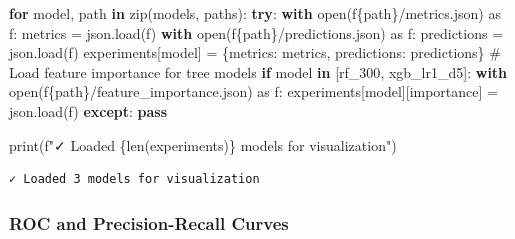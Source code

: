 \documentclass[
  letterpaper,
  DIV=11,
  numbers=noendperiod]{scrartcl}
\newenvironment{Shaded}{\begin{snugshade}}{\end{snugshade}}
\newcommand{\BuiltInTok}[1]{\textcolor[rgb]{0.00,0.23,0.31}{#1}}
\newcommand{\CommentTok}[1]{\textcolor[rgb]{0.37,0.37,0.37}{#1}}
\newcommand{\ControlFlowTok}[1]{\textcolor[rgb]{0.00,0.23,0.31}{\textbf{#1}}}
\newcommand{\ImportTok}[1]{\textcolor[rgb]{0.00,0.46,0.62}{#1}}
\newcommand{\KeywordTok}[1]{\textcolor[rgb]{0.00,0.23,0.31}{\textbf{#1}}}
\newcommand{\NormalTok}[1]{\textcolor[rgb]{0.00,0.23,0.31}{#1}}
\newcommand{\OperatorTok}[1]{\textcolor[rgb]{0.37,0.37,0.37}{#1}}
\newcommand{\SpecialCharTok}[1]{\textcolor[rgb]{0.37,0.37,0.37}{#1}}
\newcommand{\SpecialStringTok}[1]{\textcolor[rgb]{0.13,0.47,0.30}{#1}}
\newcommand{\StringTok}[1]{\textcolor[rgb]{0.13,0.47,0.30}{#1}}
\renewenvironment{Shaded}{%
  \begin{tcolorbox}[%
    enhanced,%
    colback=codebg,%
    colframe=codebg,%
    borderline west={3pt}{0pt}{sectionblue},%
    fontupper=\small\ttfamily,%
    boxrule=0pt,%
    arc=0pt,%
    boxsep=5pt,%
    left=2mm,%
    right=2mm,%
    top=2mm,%
    bottom=2mm%
  ]%
}{%
  \end{tcolorbox}%
}
\begin{document}
\begin{Shaded}
\begin{Highlighting}[]
\ControlFlowTok{for}\NormalTok{ model, path }\KeywordTok{in} \BuiltInTok{zip}\NormalTok{(models, paths):}
    \ControlFlowTok{try}\NormalTok{:}
        \ControlFlowTok{with} \BuiltInTok{open}\NormalTok{(}\SpecialStringTok{f\textquotesingle{}}\SpecialCharTok{\{}\NormalTok{path}\SpecialCharTok{\}}\SpecialStringTok{/metrics.json\textquotesingle{}}\NormalTok{) }\ImportTok{as}\NormalTok{ f: metrics }\OperatorTok{=}\NormalTok{ json.load(f)}
        \ControlFlowTok{with} \BuiltInTok{open}\NormalTok{(}\SpecialStringTok{f\textquotesingle{}}\SpecialCharTok{\{}\NormalTok{path}\SpecialCharTok{\}}\SpecialStringTok{/predictions.json\textquotesingle{}}\NormalTok{) }\ImportTok{as}\NormalTok{ f: predictions }\OperatorTok{=}\NormalTok{ json.load(f)}
\NormalTok{        experiments[model] }\OperatorTok{=}\NormalTok{ \{}\StringTok{\textquotesingle{}metrics\textquotesingle{}}\NormalTok{: metrics, }\StringTok{\textquotesingle{}predictions\textquotesingle{}}\NormalTok{: predictions\}}
        \CommentTok{\# Load feature importance for tree models}
        \ControlFlowTok{if}\NormalTok{ model }\KeywordTok{in}\NormalTok{ [}\StringTok{\textquotesingle{}rf\_300\textquotesingle{}}\NormalTok{, }\StringTok{\textquotesingle{}xgb\_lr1\_d5\textquotesingle{}}\NormalTok{]:}
            \ControlFlowTok{with} \BuiltInTok{open}\NormalTok{(}\SpecialStringTok{f\textquotesingle{}}\SpecialCharTok{\{}\NormalTok{path}\SpecialCharTok{\}}\SpecialStringTok{/feature\_importance.json\textquotesingle{}}\NormalTok{) }\ImportTok{as}\NormalTok{ f:}
\NormalTok{                experiments[model][}\StringTok{\textquotesingle{}importance\textquotesingle{}}\NormalTok{] }\OperatorTok{=}\NormalTok{ json.load(f)}
    \ControlFlowTok{except}\NormalTok{: }\ControlFlowTok{pass}

\BuiltInTok{print}\NormalTok{(}\SpecialStringTok{f"✓ Loaded }\SpecialCharTok{\{}\BuiltInTok{len}\NormalTok{(experiments)}\SpecialCharTok{\}}\SpecialStringTok{ models for visualization"}\NormalTok{)}
\end{Highlighting}
\end{Shaded}

\begin{verbatim}
✓ Loaded 3 models for visualization
\end{verbatim}

\subsubsection{ROC and Precision-Recall
Curves}\label{roc-and-precision-recall-curves}
\end{document}
